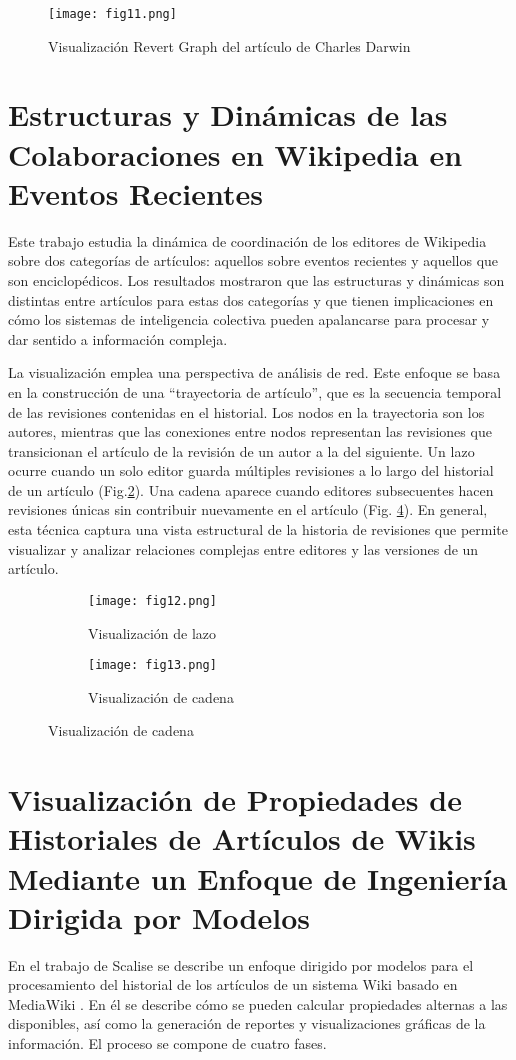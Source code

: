 \begin{figure}[ht]
  \centering
  \texttt{[image: fig11.png]}
  \caption{Visualización Revert Graph del artículo de Charles Darwin}
  \label{fig11}
\end{figure}

\section{Estructuras y Dinámicas de las Colaboraciones en Wikipedia en Eventos Recientes}
Este trabajo estudia la dinámica de coordinación de los editores de Wikipedia sobre dos categorías de artículos: aquellos sobre eventos recientes y aquellos que son enciclopédicos. Los resultados mostraron que las estructuras y dinámicas son distintas entre artículos para estas dos categorías y que tienen implicaciones en cómo los sistemas de inteligencia colectiva pueden apalancarse para procesar y dar sentido a información compleja.

La visualización emplea una perspectiva de análisis de red. Este enfoque se basa en la construcción de una “trayectoria de artículo”, que es la secuencia temporal de las revisiones contenidas en el historial. Los nodos en la trayectoria son los autores, mientras que las conexiones entre nodos representan las revisiones que transicionan el artículo de la revisión de un autor a la del siguiente. Un lazo ocurre cuando un solo editor guarda múltiples revisiones a lo largo del historial de un artículo (Fig.\ref{fig12}). Una cadena aparece cuando editores subsecuentes hacen revisiones únicas sin contribuir nuevamente en el artículo (Fig. \ref{fig13}). En general, esta técnica captura una vista estructural de la historia de revisiones que permite visualizar y analizar relaciones complejas entre editores y las versiones de un artículo.

\begin{figure}
  \begin{subfigure}[b]{0.5\textwidth}
    \centering
    \texttt{[image: fig12.png]}
    \caption{Visualización de lazo}
    \label{fig12}
  \end{subfigure}
  \hfill
  \begin{subfigure}[b]{0.45\textwidth}
    \centering
    \texttt{[image: fig13.png]}
    \caption{Visualización de cadena}
    \label{fig13}
  \end{subfigure}
\end{figure}

\section{Visualización de Propiedades de Historiales de Artículos de Wikis Mediante un Enfoque de Ingeniería Dirigida por Modelos}
En el trabajo de Scalise se describe un enfoque dirigido por modelos para el procesamiento del historial de los artículos de un sistema Wiki basado en MediaWiki \cite{Scalise2008a}. En él se describe cómo se pueden calcular propiedades alternas a las disponibles, así como la generación de reportes y visualizaciones gráficas de la información. El proceso se compone de cuatro fases.

